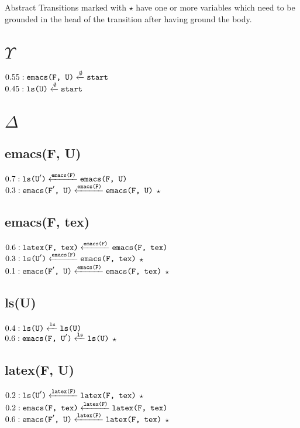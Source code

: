 \documentclass[11pt, oneside]{article}   	%
\title{}
\author{}
\date{}							%
\begin{document}

\DeclarePairedDelimiter{\norm}{\lVert}{\rVert}

Abstract Transitions marked with $\star$ have one or more variables which need to be grounded in the head of the transition after having ground the body.

\section{$\Upsilon$}
$0.55: \verb!emacs(F, U)! \xleftarrow{\emptyset} \verb!start!$\\
$0.45: \verb!ls(U)! \xleftarrow{\emptyset} \verb!start!$

\section{$\Delta$}
\subsection{emacs(F, U)}
$0.7: \verb!ls(U!'\verb!)! \xleftarrow{\texttt{emacs(F)}} \verb!emacs(F, U)!$\\
$0.3: \verb!emacs(F!'\verb!, U)! \xleftarrow{\texttt{emacs(F)}} \verb!emacs(F, U)!$ $\star$

\subsection{emacs(F, tex)}
$0.6: \verb!latex(F, tex)! \xleftarrow{\texttt{emacs(F)}} \verb!emacs(F, tex)!$\\
$0.3: \verb!ls(U!'\verb!)! \xleftarrow{\texttt{emacs(F)}} \verb!emacs(F, tex)!$ $\star$\\
$0.1: \verb!emacs(F!'\verb!, U)! \xleftarrow{\texttt{emacs(F)}} \verb!emacs(F, tex)!$ $\star$

\subsection{ls(U)}
$0.4: \verb!ls(U)! \xleftarrow{\texttt{ls}} \verb!ls(U)!$\\
$0.6: \verb!emacs(F, U!'\verb!)! \xleftarrow{\texttt{ls}} \verb!ls(U)!$ $\star$

\subsection{latex(F, U)}
$0.2: \verb!ls(U!'\verb!)! \xleftarrow{\texttt{latex(F)}} \verb!latex(F, tex)!$ $\star$\\
$0.2: \verb!emacs(F, tex)! \xleftarrow{\texttt{latex(F)}} \verb!latex(F, tex)!$\\
$0.6: \verb!emacs(F!'\verb!, U)! \xleftarrow{\texttt{latex(F)}} \verb!latex(F, tex)!$ $\star$
\end{document}
